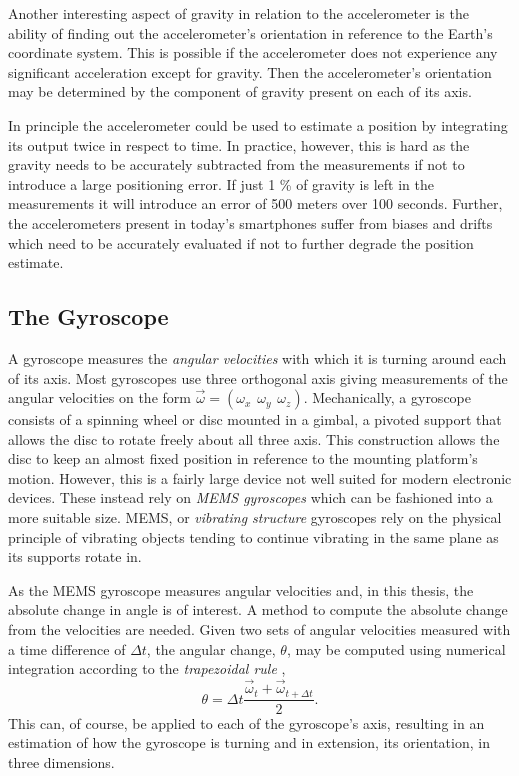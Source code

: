 \documentclass{LTHthesis}
\begin{document}
Another interesting aspect of gravity in relation to the accelerometer is the ability of finding out the accelerometer's orientation in reference to the Earth's coordinate system. This is possible if the accelerometer does not experience any significant acceleration except for gravity. Then the accelerometer's orientation may be determined by the component of gravity present on each of its axis. 

In principle the accelerometer could be used to estimate a position by integrating its output twice in respect to time. In practice, however, this is hard as the gravity needs to be accurately subtracted from the measurements if not to introduce a large positioning error. If just 1 \% of gravity is left in the measurements it will introduce an error of  500 meters over 100 seconds. Further, the accelerometers present in today's smartphones suffer from biases and drifts which need to be accurately evaluated if not to further degrade the position estimate. 
%
\subsection{The Gyroscope}
%
A gyroscope measures the \emph{angular velocities} with which it is turning around each of its axis. Most gyroscopes use three orthogonal axis giving measurements of the angular velocities on the form $\vec\omega = (\omega_x \hspace{5pt} \omega_y \hspace{5pt} \omega_z)$.  Mechanically, a gyroscope consists of a spinning wheel or disc mounted in a gimbal, a pivoted support that allows the disc to rotate freely about all three axis. This construction allows the disc to keep an almost fixed position in reference to the mounting platform's motion. However, this is a fairly large device not well suited for modern electronic devices. These instead rely on \emph{MEMS gyroscopes} which can be fashioned into a more suitable size. MEMS, or \emph{vibrating structure} gyroscopes rely on the physical principle of vibrating objects tending to continue vibrating in the same plane as its supports rotate in.  

As the MEMS gyroscope measures angular velocities and, in this thesis, the absolute change in angle is of interest. A method to compute the absolute change from the velocities are needed. Given two sets of angular velocities measured with a time difference of $\Delta t$, the angular change, $\theta$, may be computed using  numerical integration according to the \emph{trapezoidal rule} \cite{analysis},  
\begin{equation}
\theta=\Delta t \frac{\vec \omega _t +\vec \omega _{t+\Delta t}}{2}.\label{eq:trapetzoidal}
\end{equation} 
%
This can, of course, be applied to each of the gyroscope's axis, resulting in an estimation of how the gyroscope is turning and in extension, its orientation, in three dimensions. 
\end{document}
